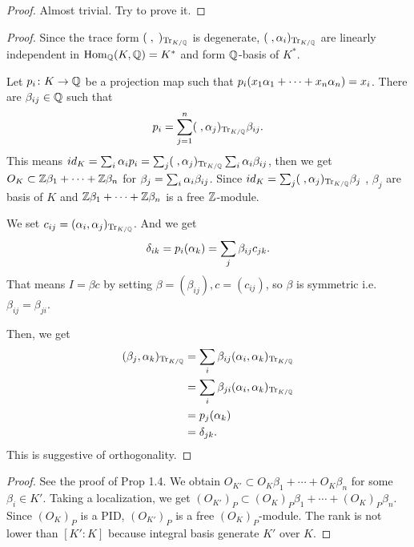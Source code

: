 
\begin{proof}
  Almost trivial. Try to prove it.
\end{proof}


\begin{proof}
  Since the trace form $(\;,\;)_{\operatorname{Tr}_{K/{\mathbb Q}}}$ is degenerate, $(\;, {\alpha}_i)_{\operatorname{Tr}_{K/{\mathbb Q}}}$ are linearly independent in $\operatorname{Hom}_{{\mathbb Q}} (K,{\mathbb Q}) = K^*$ and form ${\mathbb Q}$-basis of $K^*$.

  Let $p_i \colon K \to {\mathbb Q}$ be a projection map such that $p_i(x_1{\alpha}_1 + \cdots + x_n{\alpha}_n) = x_i$. There are $\beta_{ij} \in {\mathbb Q}$ such that
  \[
  p_i = \sum_{j=1}^n (\;, {\alpha}_j)_{\operatorname{Tr}_{K/{\mathbb Q}}} \beta_{ij}.
  \]
  This means $id_K = \sum_i {\alpha}_i p_i = \sum_j (\;, {\alpha}_j)_{\operatorname{Tr}_{K/{\mathbb Q}}} \sum_i {\alpha}_i \beta_{ij}$, then we get
  $O_K \subset {\mathbb Z} \beta_1 + \cdots + {\mathbb Z} \beta_n$ for $\beta_j = \sum_i {\alpha}_i \beta_{ij}$. Since $id_K  = \sum_j (\;, {\alpha}_j)_{\operatorname{Tr}_{K/{\mathbb Q}}} \beta_j$ , $\beta_j$ are basis of $K$ and ${\mathbb Z} \beta_1 + \cdots + {\mathbb Z} \beta_n$ is a free ${\mathbb Z}$-module.

  We set $c_{ij} = ({\alpha}_i, {\alpha}_j)_{\operatorname{Tr}_{K/{\mathbb Q}}}$. And we get
  \[
  {\delta}_{ik} = p_i({\alpha}_k) = \sum_j \beta_{ij} c_{jk}.
  \]
  That means $I = \beta c$ by setting $\beta = (\beta_{ij}), c=(c_{ij})$, so $\beta$ is symmetric i.e. $\beta_{ij} = \beta_{ji}$.

  Then, we get
  \begin{align*}
    (\beta_j, {\alpha}_k)_{\operatorname{Tr}_{K/{\mathbb Q}}} &= \sum_i \beta_{ij} ({\alpha}_i, {\alpha}_k)_{\operatorname{Tr}_{K/{\mathbb Q}}} \\
    &= \sum_i \beta_{ji} ({\alpha}_i, {\alpha}_k)_{\operatorname{Tr}_{K/{\mathbb Q}}} \\
    &= p_j({\alpha}_k ) \\
    &= {\delta}_{jk}.
  \end{align*}
  This is suggestive of orthogonality.
\end{proof}


\begin{proof}
See the proof of Prop 1.4. We obtain $O_{K'} \subset O_K \beta_1 + \cdots +  O_K \beta_n$ for some $\beta_i \in K'$. Taking a localization, we get $(O_{K'})_P \subset (O_K)_P \beta_1 + \cdots +  (O_K)_P \beta_n$. Since $(O_K)_P$ is a PID, $(O_{K'})_P$ is a free $(O_K)_P$-module. The rank is not lower than $[K':K]$ because integral basis generate $K'$ over $K$.
\end{proof}


